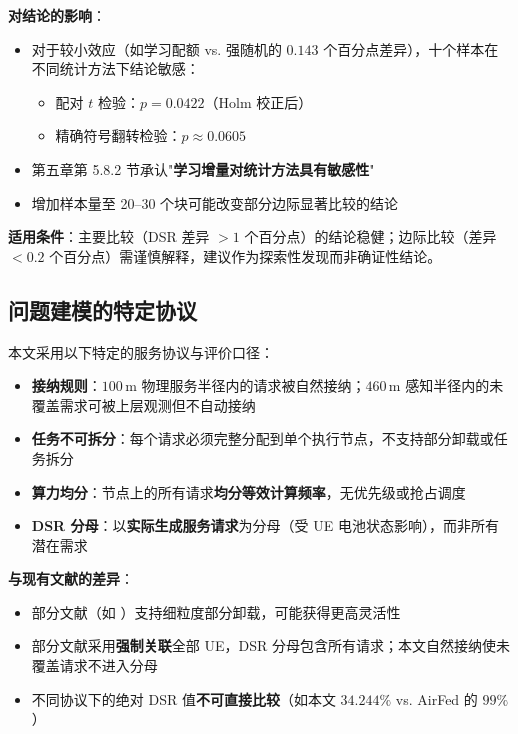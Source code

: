 \textbf{对结论的影响}：
\begin{itemize}
    \item 对于较小效应（如学习配额 vs. 强随机的 $0.143$ 个百分点差异），十个样本在不同统计方法下结论敏感：
    \begin{itemize}
        \item 配对 $t$ 检验：$p=0.0422$（Holm 校正后）
        \item 精确符号翻转检验：$p\approx 0.0605$
    \end{itemize}
    \item 第五章第 5.8.2 节承认"\textbf{学习增量对统计方法具有敏感性}"
    \item 增加样本量至 20--30 个块可能改变部分边际显著比较的结论
\end{itemize}

\textbf{适用条件}：主要比较（DSR 差异 $>1$ 个百分点）的结论稳健；边际比较（差异 $<0.2$ 个百分点）需谨慎解释，建议作为探索性发现而非确证性结论。

\subsection{问题建模的特定协议}
\label{sec:protocol-assumptions}

本文采用以下特定的服务协议与评价口径：
\begin{itemize}
    \item \textbf{接纳规则}：$100\,\mathrm{m}$ 物理服务半径内的请求被自然接纳；$460\,\mathrm{m}$ 感知半径内的未覆盖需求可被上层观测但不自动接纳
    \item \textbf{任务不可拆分}：每个请求必须完整分配到单个执行节点，不支持部分卸载或任务拆分
    \item \textbf{算力均分}：节点上的所有请求\textbf{均分等效计算频率}，无优先级或抢占调度
    \item \textbf{DSR 分母}：以\textbf{实际生成服务请求}为分母（受 UE 电池状态影响），而非所有潜在需求
\end{itemize}

\textbf{与现有文献的差异}：
\begin{itemize}
    \item 部分文献（如 \cite{wang2026ccah}）支持细粒度部分卸载，可能获得更高灵活性
    \item 部分文献采用\textbf{强制关联}全部 UE，DSR 分母包含所有请求；本文自然接纳使未覆盖请求不进入分母
    \item 不同协议下的绝对 DSR 值\textbf{不可直接比较}（如本文 $34.244\%$ vs. AirFed \cite{nguyen2024airfed} 的 $99\%$）
\end{itemize}

